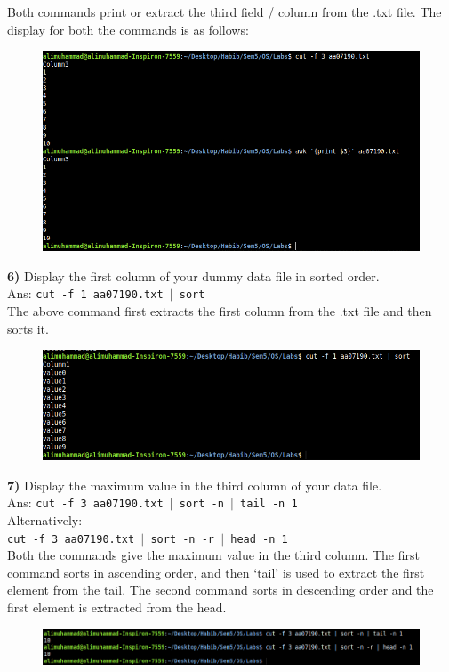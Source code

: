 \documentclass{article}
\theoremstyle{mytheoremstyle}
\theoremstyle{mytheoremstyle}
\theoremstyle{myproblemstyle}
\begin{document}
Both commands print or extract the third field / column from the .txt file. The display for both the commands is as follows:
\begin{figure}[htbp]
    \includegraphics[width=1.0\textwidth]{lab2_5.png}
\end{figure}

\vspace*{10mm}
\textbf{6)} Display the first column of your dummy data file in sorted order. \\
Ans: \texttt{cut -f 1 aa07190.txt $|$ sort} \\
The above command first extracts the first column from the .txt file and then sorts it. 
\begin{figure}[htbp]
    \includegraphics[width=1.0\textwidth]{lab2_6.png}
\end{figure}

\pagebreak
\textbf{7)} Display the maximum value in the third column of your data file. \\
Ans: \texttt{cut -f 3 aa07190.txt $|$ sort -n $|$ tail -n 1} \\ Alternatively: \\ \texttt{cut -f 3 aa07190.txt $|$ sort -n -r $|$ head -n 1} \\
Both the commands give the maximum value in the third column. The first command sorts in ascending order, and then `tail' is used to extract the first element from the tail. The second command sorts in descending order and the first element is extracted from the head.
\begin{figure}[htbp]
    \includegraphics[width=1.0\textwidth]{lab2_7.png}
\end{figure}
\end{document}
